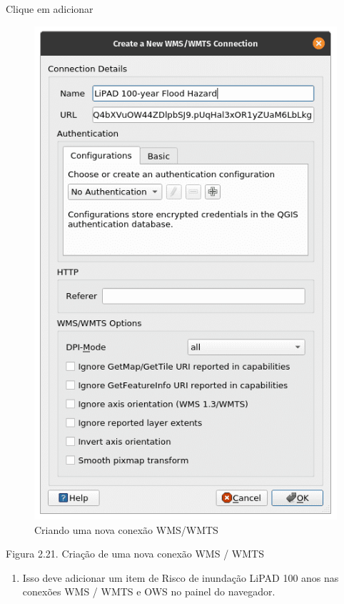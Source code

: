 \documentclass[
]{krantz}
\providecommand{\tightlist}{%
  \setlength{\itemsep}{0pt}\setlength{\parskip}{0pt}}
\begin{document}
Clique em adicionar

\begin{figure}
\centering
\includegraphics{media/modulo2/wms-1.png}
\caption{Criando uma nova conexão WMS/WMTS}
\end{figure}

Figura 2.21. Criação de uma nova conexão WMS / WMTS

\begin{enumerate}
\def\labelenumi{\arabic{enumi}.}
\setcounter{enumi}{4}
\tightlist
\item
  Isso deve adicionar um item de Risco de inundação LiPAD 100 anos nas conexões WMS / WMTS e OWS no painel do navegador.
\end{enumerate}
\end{document}
